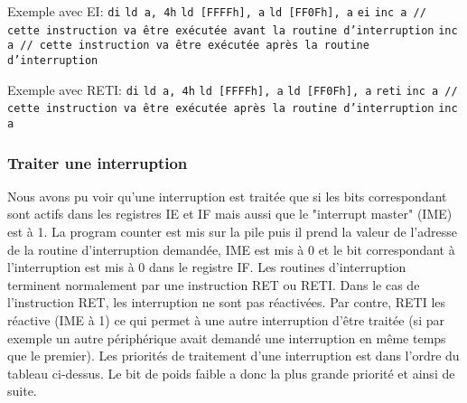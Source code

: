 \documentclass[a4paper]{article}
\begin{document}
Exemple avec EI: \newline
\texttt{di} \newline
\texttt{ld a, 4h} \newline
\texttt{ld [FFFFh], a} \newline
\texttt{ld [FF0Fh], a} \newline
\texttt{ei} \newline
\texttt{inc a // cette instruction va être exécutée avant la routine d'interruption} \newline
\texttt{inc a // cette instruction va être exécutée après la routine d'interruption} \newline

Exemple avec RETI: \newline
\texttt{di} \newline
\texttt{ld a, 4h} \newline
\texttt{ld [FFFFh], a} \newline
\texttt{ld [FF0Fh], a} \newline
\texttt{reti} \newline
\texttt{inc a // cette instruction va être exécutée après la routine d'interruption} \newline
\texttt{inc a} \newline

\subsubsection{Traiter une interruption}
Nous avons pu voir qu'une interruption est traitée que si les bits correspondant
sont actifs dans les registres IE et IF mais aussi que le "interrupt master" (IME) est
à 1. La program counter est mis sur la pile puis il prend la valeur de l'adresse 
de la routine d'interruption demandée, IME est mis à 0 et le 
bit correspondant à l'interruption est mis à 0 dans le registre IF. Les routines
d'interruption terminent normalement par une instruction RET ou RETI. Dans le cas
de l'instruction RET, les interruption ne sont pas réactivées. Par contre, RETI
les réactive (IME à 1) ce qui permet à une autre interruption d'être
traitée (si par exemple un autre périphérique avait demandé une interruption en même
temps que le premier). Les priorités de traitement d'une interruption est dans l'ordre
du tableau ci-dessus. Le bit de poids faible a donc la plus grande priorité et ainsi
de suite.
\end{document}
